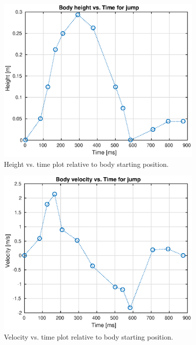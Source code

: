 \begin{figure}
\centering
\includegraphics[width=0.9\textwidth]{images/experiments/jump/height-vs-time.eps} 
\caption{Height vs. time plot relative to body starting position.}
\label{fig:height-time-jump}
\end{figure}

\begin{figure}
\centering
\includegraphics[width=0.9\textwidth]{images/experiments/jump/velocity-vs-time.eps} 
\caption{Velocity vs. time plot relative to body starting position.}
\label{fig:velocity-time-jump}
\end{figure}


